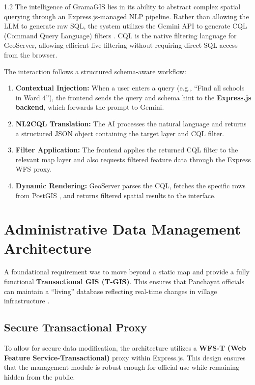 \begin{spacing}{1.2}
The intelligence of GramaGIS lies in its ability to abstract complex spatial querying through an Express.js-managed NLP pipeline. Rather than allowing the LLM to generate raw SQL, the system utilizes the Gemini API to generate CQL (Command Query Language) filters \cite{liu2025nalspatial}. CQL is the native filtering language for GeoServer, allowing efficient live filtering without requiring direct SQL access from the browser.

The interaction follows a structured schema-aware workflow:

\begin{enumerate}
\item \textbf{Contextual Injection:} When a user enters a query (e.g., ``Find all schools in Ward 4''), the frontend sends the query and schema hint to the \textbf{Express.js backend}, which forwards the prompt to Gemini.
\item \textbf{NL2CQL Translation:} The AI processes the natural language and returns a structured JSON object containing the target layer and CQL filter.
\item \textbf{Filter Application:} The frontend applies the returned CQL filter to the relevant map layer and also requests filtered feature data through the Express WFS proxy.
\item \textbf{Dynamic Rendering:} GeoServer parses the CQL, fetches the specific rows from PostGIS \cite{postgis_in_action}, and returns filtered spatial results to the interface.
\end{enumerate}

\section{Administrative Data Management Architecture}

A foundational requirement was to move beyond a static map and provide a fully functional \textbf{Transactional GIS (T-GIS)}. This ensures that Panchayat officials can maintain a ``living'' database reflecting real-time changes in village infrastructure \cite{smart_panchayat2023}.

\subsection{Secure Transactional Proxy}

To allow for secure data modification, the architecture utilizes a \textbf{WFS-T (Web Feature Service-Transactional)} proxy within Express.js. This design ensures that the management module is robust enough for official use while remaining hidden from the public.


\end{spacing}
